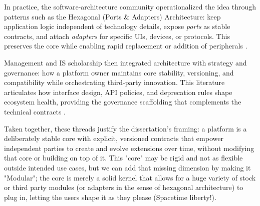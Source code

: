 In practice, the software-architecture community operationalized the idea through patterns such as the Hexagonal (Ports \& Adapters) Architecture: keep application logic independent of technology details, expose \emph{ports} as stable contracts, and attach \emph{adapters} for specific UIs, devices, or protocols. This preserves the core while enabling rapid replacement or addition of peripherals \cite{cockburn2005hexagonal}. 

Management and IS scholarship then integrated architecture with strategy and governance: how a platform owner maintains core stability, versioning, and compatibility while orchestrating third-party innovation. This literature articulates how interface design, API policies, and deprecation rules shape ecosystem health, providing the governance scaffolding that complements the technical contracts \cite{gawer2002platformleadership,tiwana2014platformecosystems}. 

Taken together, these threads justify the dissertation's framing: a platform is a deliberately stable core with explicit, versioned contracts that empower independent parties to create and evolve extensions over time, without modifying that core or building on top of it. This "core" may be rigid and not as flexible outside intended use cases, but we can add that missing dimension by making it "Modular"; the core is merely a solid kernel that allows for a huge variety of stock or third party modules (or adapters in the sense of hexagonal architecture) to plug in, letting the users shape it as they please (Spacetime liberty!).

